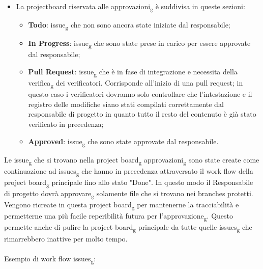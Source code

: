 \begin{itemize}
	\item La projectboard riservata alle approvazioni\textsubscript{g} è suddivisa in queste sezioni:
	\begin{itemize}
		\item \textbf{Todo}: issue\textsubscript{g} che non sono ancora state iniziate dal responsabile;
		\item \textbf{In Progress}: issue\textsubscript{g}  che sono state prese in carico per essere approvate dal responsabile;
		\item \textbf{Pull Request}: issue\textsubscript{g} che è in fase di integrazione e necessita della verifica\textsubscript{g} dei verificatori. Corrisponde all'inizio di una pull request;
		in questo caso i verificatori dovranno solo controllare che l'intestazione e il registro delle modifiche siano stati compilati correttamente dal responsabile di progetto in quanto tutto il resto del contenuto è già stato verificato in precedenza;
		\item \textbf{Approved}: issue\textsubscript{g} che sono state approvate dal responsabile.
	\end{itemize}
\end{itemize}
Le issue\textsubscript{g} che si trovano nella project board\textsubscript{g} approvazioni\textsubscript{g} sono state create come continuazione ad issues\textsubscript{g} che hanno in precedenza attraversato il work flow della project board\textsubscript{g} principale fino allo stato "Done".
In questo modo il Responsabile di progetto dovrà approvare\textsubscript{g} solamente file che si trovano nei branches protetti.
Vengono ricreate in questa project board\textsubscript{g} per  mantenerne la tracciabilità e permetterne una più facile reperibilità futura per l'approvazione\textsubscript{g}.
Questo permette anche di pulire la project board\textsubscript{g} principale da tutte quelle issues\textsubscript{g} che rimarrebbero inattive per molto tempo.
\\\\
Esempio di work flow issues\textsubscript{g}:
